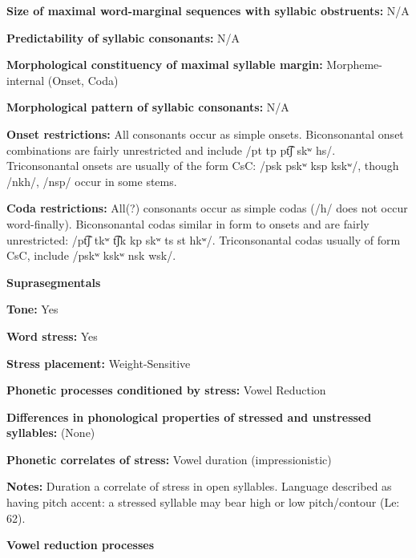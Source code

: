 \textbf{Size of maximal word{}-marginal sequences with syllabic obstruents:} N/A



\textbf{Predictability of syllabic consonants:} N/A



\textbf{Morphological constituency of maximal syllable margin:} Morpheme-internal (Onset, Coda)



\textbf{Morphological pattern of syllabic consonants:} N/A



\textbf{Onset restrictions:} All consonants occur as simple onsets. Biconsonantal onset combinations are fairly unrestricted and include /pt tp pt͡ʃ skʷ hs/. Triconsonantal onsets are usually of the form CsC: /psk pskʷ ksp kskʷ/, though /nkh/, /nsp/ occur in some stems.



\textbf{Coda restrictions:} All(?) consonants occur as simple codas (/h/ does not occur word-finally). Biconsonantal codas similar in form to onsets and are fairly unrestricted: /pt͡ʃ tkʷ t͡ʃk kp skʷ ts st hkʷ/. Triconsonantal codas usually of form CsC, include /pskʷ kskʷ nsk wsk/.



\textbf{Suprasegmentals}



\textbf{Tone:} Yes



\textbf{Word stress:} Yes



\textbf{Stress placement:} Weight-Sensitive



\textbf{Phonetic processes conditioned by stress:} Vowel Reduction



\textbf{Differences in phonological properties of stressed and unstressed syllables:} (None)



\textbf{Phonetic correlates of stress:} Vowel duration (impressionistic)



\textbf{Notes:} Duration a correlate of stress in open syllables. Language described as having pitch accent: a stressed syllable may bear high or low pitch/contour (Le\citealt{Sourd1993}: 62).



\textbf{Vowel reduction processes}



